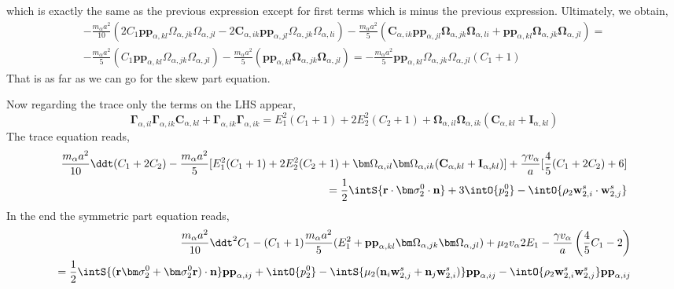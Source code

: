 which is exactly the same as the previous expression except for first terms which is minus the previous expression. 
Ultimately, we obtain, 
\begin{align*}
    - \frac{m_\alpha a^2}{10}
    (2 C_1 \textbf{pp}_{\alpha,kl}\Omega_{\alpha,jk}\Omega_{\alpha,jl}
    - 2 \textbf{C}_{\alpha,ik} \textbf{pp}_{\alpha,jl}
    \Omega_{\alpha,jk}\Omega_{\alpha,li})
    - \frac{m_\alpha a^2}{5}
    (
        \textbf{C}_{\alpha,ik} 
    \textbf{pp}_{\alpha,jl} 
    \bm\Omega_{\alpha,jk}
    \bm\Omega_{\alpha,li}
    + 
    \textbf{pp}_{\alpha,kl} \bm\Omega_{\alpha,jk} \bm\Omega_{\alpha,jl}
    )
    = \\
    - \frac{m_\alpha a^2}{5}
    (C_1 \textbf{pp}_{\alpha,kl}\Omega_{\alpha,jk}\Omega_{\alpha,jl}
)
    - \frac{m_\alpha a^2}{5}
    ( 
    \textbf{pp}_{\alpha,kl} \bm\Omega_{\alpha,jk} \bm\Omega_{\alpha,jl}
    )
    = 
    - \frac{m_\alpha a^2}{5}
     \textbf{pp}_{\alpha,kl}\Omega_{\alpha,jk}\Omega_{\alpha,jl} (C_1 +1 )
\end{align*}
That is as far as we can go for the skew part equation. 

Now regarding the trace only the terms on the LHS appear, 
\begin{equation*}
    \bm\Gamma_{\alpha,il}\bm\Gamma_{\alpha,ik} \textbf{C}_{\alpha,kl} 
        + \bm\Gamma_{\alpha,ik}\bm\Gamma_{\alpha,ik} 
        = 
        E_1^2 (C_1 +1)
        + 2E_2^2 (C_2+1)
        + \bm\Omega_{\alpha,il}
        \bm\Omega_{\alpha,ik}(
            \textbf{C}_{\alpha,kl}
            + \textbf{I}_{\alpha,kl}
        )
\end{equation*}
The trace equation reads, 
\begin{align*}
    \frac{m_\alpha a^2}{10}\ddt(C_1+2C_2)
    - \frac{m_\alpha a^2}{5}        
    [E_1^2 (C_1 +1)
    + 2E_2^2 (C_2+1)
    + \bm\Omega_{\alpha,il}
    \bm\Omega_{\alpha,ik}(
        \textbf{C}_{\alpha,kl}
        + \textbf{I}_{\alpha,kl}
    )]
    +  \frac{  \gamma v_\alpha }{ a} 
    [\frac{4}{5}(C_1+2C_2) + 6]\\
    =\frac{1}{2} \intS{\textbf{r}\cdot \bm\sigma_2^0\cdot \textbf{n}}
    + 3 \intO{p_2^0 }
    - \intO{\rho_2 \textbf{w}_{2,i}^s\cdot\textbf{w}_{2,j}^s} 
\end{align*}
In the end the symmetric part equation reads, 
\begin{align*}
    \frac{m_\alpha a^2}{10}\ddt^2 C_1
    - (C_1 + 1) \frac{m_\alpha a^2}{5}(
         E_1^2
        + \textbf{pp}_{\alpha,kl}\bm\Omega_{\alpha,jk}\bm\Omega_{\alpha,jl})
    + \mu_2 v_\alpha 2 E_1
    - \frac{ \gamma v_\alpha }{ a} \left(\frac{4}{5}
        C_1
        -2 
    \right)\nonumber\\
    = \frac{1}{2}\intS{(\textbf{r}\bm\sigma_2^0+ \bm\sigma_2^0\textbf{r})\cdot \textbf{n}}\textbf{pp}_{\alpha,ij}
    + \intO{p_2^0 }
    - \intS{\mu_2 (\textbf{n}_i \textbf{w}_{2,j}^s + \textbf{n}_j \textbf{w}_{2,i}^s)}\textbf{pp}_{\alpha,ij}
    - \intO{\rho_2 \textbf{w}_{2,i}^s\textbf{w}_{2,j}^s} \textbf{pp}_{\alpha,ij}
\end{align*}


